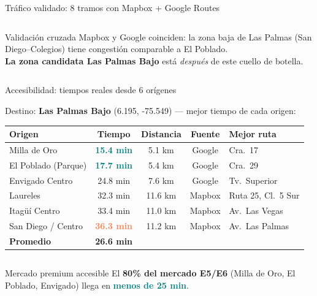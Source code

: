 \documentclass[aspectratio=169, 11pt]{beamer}
\newcommand{\highlight}[1]{\textcolor{teal}{\textbf{#1}}}
\newcommand{\danger}[1]{\textcolor{coral}{\textbf{#1}}}
\newcommand{\src}[1]{\par\vspace{2pt}{\tiny\textcolor{slate}{Fuente: #1}}}
\begin{document}
\begin{frame}{Tráfico validado: 8 tramos con Mapbox + Google Routes}
\begin{columns}[T]
\vspace{6pt}
\begin{exampleblock}{\small Validación cruzada}
\small Mapbox y Google coinciden: la zona baja de Las Palmas (San Diego--Colegios) tiene congestión comparable a El Poblado.\\[4pt]
\textbf{La zona candidata Las Palmas Bajo} está \emph{después} de este cuello de botella.
\end{exampleblock}
\end{columns}
\end{frame}

\begin{frame}{Accesibilidad: tiempos reales desde 6 orígenes}

Destino: \textbf{Las Palmas Bajo} (6.195, -75.549) — mejor tiempo de cada origen:

\vspace{8pt}
\begin{center}
{\small
\begin{tabular}{@{}lcccl@{}}
\toprule
\textbf{Origen} & \textbf{Tiempo} & \textbf{Distancia} & \textbf{Fuente} & \textbf{Mejor ruta} \\
\midrule
\rowcolor{teal!10}
Milla de Oro & \highlight{15.4 min} & 5.1 km & Google & Cra.\ 17 \\
\rowcolor{teal!8}
El Poblado (Parque) & \highlight{17.7 min} & 5.4 km & Google & Cra.\ 29 \\
Envigado Centro & 24.8 min & 7.6 km & Google & Tv.\ Superior \\
Laureles & 32.3 min & 11.6 km & Mapbox & Ruta 25, Cl.\ 5 Sur \\
Itagüí Centro & 33.4 min & 11.0 km & Mapbox & Av.\ Las Vegas \\
\rowcolor{coral!8}
San Diego / Centro & \danger{36.3 min} & 11.2 km & Mapbox & Av.\ Las Palmas \\
\midrule
\textbf{Promedio} & \textbf{26.6 min} & & & \\
\bottomrule
\end{tabular}
}
\end{center}

\vspace{6pt}
\src{Mapbox Directions API (driving-traffic) + Google Routes API (TRAFFIC\_AWARE), marzo 2026}

\vspace{8pt}
\begin{columns}[T]
\begin{exampleblock}{\small Mercado premium accesible}
\small El \textbf{80\% del mercado E5/E6} (Milla de Oro, El Poblado, Envigado) llega en \highlight{menos de 25 min}.
\end{exampleblock}


\end{columns}
\end{frame}
\end{document}
